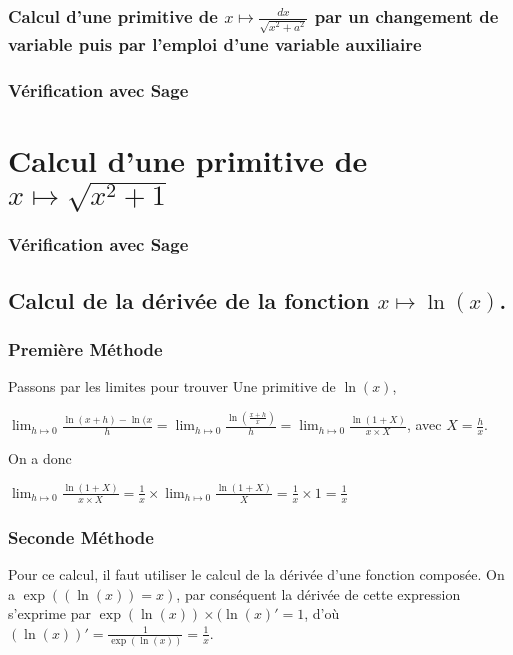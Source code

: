 \documentclass[a4paper,12pt]{report}
\begin{document}
\subsubsection{Calcul d'une primitive de $  x \longmapsto  \frac{dx}{\sqrt{x^2+ a^2} } $ par un changement de variable puis par l'emploi d'une variable auxiliaire} 

\subsubsection{Vérification avec Sage}

\section{Calcul d'une primitive de $  x \longmapsto  \sqrt{x^2 + 1}  $ \label{sqrt-001} }

\subsubsection{Vérification avec Sage}



\subsection{Calcul de la dérivée de la fonction $x \mapsto \ln(x) $.}


\subsubsection{Première Méthode}


Passons par les limites pour trouver Une primitive de $\ln(x)$,

$ \lim_{h \mapsto 0} \frac{\ln(x+h) - \ln(x}{h} = \lim_{h \mapsto 0} \frac{\ln(\frac{x+h}{x})}{h}  = \lim_{h \mapsto 0} \frac{ \ln(1+X)}{x\times X}$, avec $X=\frac{h}{x}$.


On a donc 

$\lim_{h \mapsto 0} \frac{\ln(1+X)}{x\times X} = \frac{1}{x} \times \lim_{h \mapsto 0} \frac{\ln(1+X)}{X} = \frac{1}{x} \times 1 = \frac{1}{x}$




\subsubsection{Seconde Méthode}

Pour ce calcul, il faut utiliser le calcul de la dérivée d'une fonction composée. On a $\exp((\ln(x))=x)$, par conséquent la dérivée de cette expression s'exprime par $ \exp(\ln(x)) \times (\ln(x)' = 1$, d'où $(\ln(x))' = \frac{1}{\exp(\ln(x))}  = \frac{1}{x} $.
\end{document}
